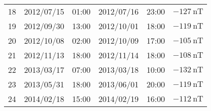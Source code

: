 \begin{table}[ht]
{\begin{tabular}{llllll}
            18 & 2012/07/15 & 01:00 & 2012/07/16 & 23:00 & $ \SI{-127}{\nano\tesla}$ \\
            19 & 2012/09/30 & 13:00 & 2012/10/01 & 18:00 & $ \SI{-119}{\nano\tesla}$ \\
            20 & 2012/10/08 & 02:00 & 2012/10/09 & 17:00 & $ \SI{-105}{\nano\tesla}$ \\
            21 & 2012/11/13 & 18:00 & 2012/11/14 & 18:00 & $ \SI{-108}{\nano\tesla}$ \\
            22 & 2013/03/17 & 07:00 & 2013/03/18 & 10:00 & $ \SI{-132}{\nano\tesla}$ \\
            23 & 2013/05/31 & 18:00 & 2013/06/01 & 20:00 & $ \SI{-119}{\nano\tesla}$ \\
            24 & 2014/02/18 & 15:00 & 2014/02/19 & 16:00 & $ \SI{-112}{\nano\tesla}$ \\ \hline
            \end{tabular}
    }
    \end{table}
    
    


